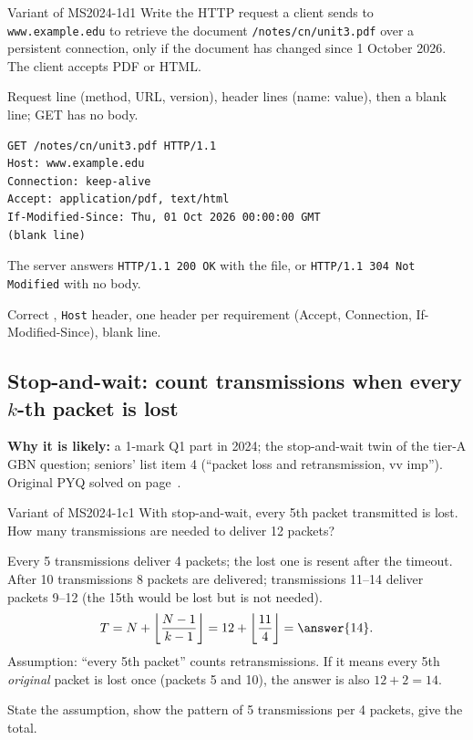 \begin{question}{Variant of MS2024-1d}{1}
Write the HTTP request a client sends to \texttt{www.example.edu} to retrieve the document \texttt{/notes/cn/unit3.pdf} over a persistent connection, only if the document has changed since 1 October 2026. The client accepts PDF or HTML.
\end{question}
\begin{solution}
Request line (method, URL, version), header lines (name: value), then a blank line; GET has no body.
\begin{lstlisting}[numbers=none]
GET /notes/cn/unit3.pdf HTTP/1.1
Host: www.example.edu
Connection: keep-alive
Accept: application/pdf, text/html
If-Modified-Since: Thu, 01 Oct 2026 00:00:00 GMT
(blank line)
\end{lstlisting}
The server answers \texttt{HTTP/1.1 200 OK} with the file, or \texttt{HTTP/1.1 304 Not Modified} with no body.
\end{solution}
\begin{answerplan}[1 mark]
Correct , \texttt{Host} header, one header per requirement (Accept, Connection, If-Modified-Since), blank line.
\end{answerplan}

\subsection{Stop-and-wait: count transmissions when every $k$-th packet is lost}\label{iq:C24}
    

\textbf{Why it is likely:} a 1-mark Q1 part in 2024; the stop-and-wait twin of the tier-A GBN question; seniors' list item 4 (``packet loss and retransmission, vv imp''). Original PYQ solved on page~\pageref{q:MS2024-1c}.

\begin{question}{Variant of MS2024-1c}{1}
With stop-and-wait, every 5th packet transmitted is lost. How many transmissions are needed to deliver 12 packets?
\end{question}
\begin{solution}
Every 5 transmissions deliver 4 packets; the lost one is resent after the timeout. After 10 transmissions 8 packets are delivered; transmissions 11--14 deliver packets 9--12 (the 15th would be lost but is not needed).
\[ T = N + \left\lfloor \frac{N-1}{k-1} \right\rfloor = 12 + \left\lfloor \frac{11}{4} \right\rfloor = \answer{14}. \]
Assumption: ``every 5th packet'' counts retransmissions. If it means every 5th \emph{original} packet is lost once (packets 5 and 10), the answer is also $12+2=14$.
\end{solution}
\begin{answerplan}[1 mark]
State the assumption, show the pattern of 5 transmissions per 4 packets, give the total.
\end{answerplan}

